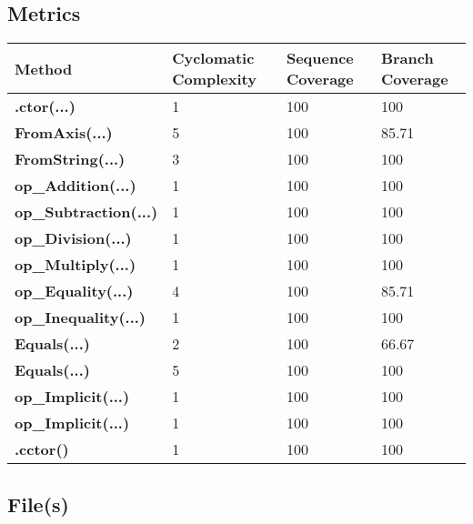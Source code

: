 \documentclass[a4paper,10pt]{article}
\begin{document}
\subsection{Metrics}
\begin{longtable}[l]{|l|l|l|l|}
\hline
\textbf{Method} & \textbf{Cyclomatic Complexity} & \textbf{Sequence Coverage} & \textbf{Branch Coverage}\\
\hline
\textbf{.ctor(...)} & 1 & 100 & 100\\
\hline
\textbf{FromAxis(...)} & 5 & 100 & 85.71\\
\hline
\textbf{FromString(...)} & 3 & 100 & 100\\
\hline
\textbf{op\_Addition(...)} & 1 & 100 & 100\\
\hline
\textbf{op\_Subtraction(...)} & 1 & 100 & 100\\
\hline
\textbf{op\_Division(...)} & 1 & 100 & 100\\
\hline
\textbf{op\_Multiply(...)} & 1 & 100 & 100\\
\hline
\textbf{op\_Equality(...)} & 4 & 100 & 85.71\\
\hline
\textbf{op\_Inequality(...)} & 1 & 100 & 100\\
\hline
\textbf{Equals(...)} & 2 & 100 & 66.67\\
\hline
\textbf{Equals(...)} & 5 & 100 & 100\\
\hline
\textbf{op\_Implicit(...)} & 1 & 100 & 100\\
\hline
\textbf{op\_Implicit(...)} & 1 & 100 & 100\\
\hline
\textbf{.cctor()} & 1 & 100 & 100\\
\hline
\end{longtable}
\subsection{File(s)}
\end{document}
